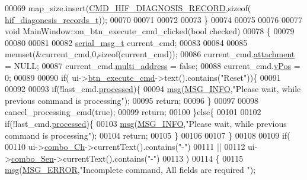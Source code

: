\begin{DoxyCode}
00069     map\_size.insert(\hyperlink{a00031_a185ed5442d69c7c8abba13323a8e8187}{CMD\_HIF\_DIAGNOSIS\_RECORD},\textcolor{keyword}{sizeof}(
      \hyperlink{a00003_a4726b814166e222a6f13e21453f76d8d}{hif\_diagonesis\_records\_t}));
00070 
00071 
00072 
00073 \}
00074 
00075 
00076 
00077 \textcolor{keywordtype}{void} MainWindow::on\_btn\_execute\_cmd\_clicked(\textcolor{keywordtype}{bool} checked)
00078 \{
00079 
00080 
00081 
00082     \hyperlink{a00001_df/dc8/a00122}{serial\_msg\_t}     current\_cmd;
00083 
00084 
00085     memset(&current\_cmd,0,\textcolor{keyword}{sizeof}(current\_cmd));
00086     current\_cmd.\hyperlink{a00001_a0b844fe783d7e252159a9641b949e83c}{attachment} = NULL;
00087     current\_cmd.\hyperlink{a00001_a8e69b971c61ced27a7567efd2bf0db59}{multi\_address} = \textcolor{keyword}{false};
00088     current\_cmd.\hyperlink{a00001_a2b48b371fd84be2a8ad581b1ad708b88}{vPos} = 0;
00089 
00090     \textcolor{keywordflow}{if}( ui->\hyperlink{a00027_a9ea50d44e38316e4203933698cbc14a6}{btn\_execute\_cmd}->text().contains(\textcolor{stringliteral}{"Reset"}))\{
00091 
00092 
00093         \textcolor{keywordflow}{if}(!last\_cmd.\hyperlink{a00001_a3e88f779da9798a5da7dda227e2ca388}{processed})\{
00094             \hyperlink{a00006_a6134b74dbfffbaf333e169bd09597b53}{msg}(\hyperlink{a00034_a1ddcc97224a95cec04b38b0ac866fa19}{MSG\_INFO},\textcolor{stringliteral}{"Please wait, while previous command is processing"});
00095             \textcolor{keywordflow}{return};
00096         \}
00097 
00098         cancel\_processing\_cmd(\textcolor{keyword}{true});
00099         \textcolor{keywordflow}{return};
00100     \}\textcolor{keywordflow}{else}\{
00101 
00102         \textcolor{keywordflow}{if}(!last\_cmd.\hyperlink{a00001_a3e88f779da9798a5da7dda227e2ca388}{processed})\{
00103             \hyperlink{a00006_a6134b74dbfffbaf333e169bd09597b53}{msg}(\hyperlink{a00034_a1ddcc97224a95cec04b38b0ac866fa19}{MSG\_INFO},\textcolor{stringliteral}{"Please wait, while previous command is processing"});
00104             \textcolor{keywordflow}{return};
00105         \}
00106 
00107     \}
00108 
00109     \textcolor{keywordflow}{if}(
00110        ui->\hyperlink{a00027_a263fb43f2eff37a44ff7359ba41e2eeb}{combo\_Ch}->currentText().contains(\textcolor{stringliteral}{"-"})
00111     ||
00112        ui->\hyperlink{a00027_ad95005b5fcac8126171019298147b285}{combo\_Sen}->currentText().contains(\textcolor{stringliteral}{"-"})
00113     )
00114     \{
00115         \hyperlink{a00006_a6134b74dbfffbaf333e169bd09597b53}{msg}(\hyperlink{a00034_aa8a990825a5a62c89d2fb8b08d8a1070}{MSG\_ERROR},\textcolor{stringliteral}{"Incomplete command, All fields are required "});

\end{DoxyCode}
